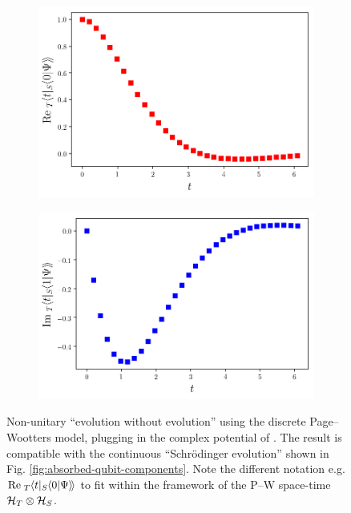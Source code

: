 \begin{figure}
  \centering
  \begin{subfigure}[b]{0.49\textwidth}
    \includegraphics[width=\linewidth]{img/2ldetect/re_psi0_t_pwlattice.png}
    \subcaption{}\label{fig:absorbed-qubit-components_pwlattice:re0}
  \end{subfigure}
  \begin{subfigure}[b]{0.49\textwidth}
    \includegraphics[width=\linewidth]{img/2ldetect/im_psi1_t_pwlattice.png}
    \subcaption{}\label{fig:absorbed-qubit-components_pwlattice:im1}
  \end{subfigure}
  \caption{
    Non-unitary ``evolution without evolution''
    using the discrete Page--Wootters model,
    plugging in
    the complex potential of \cite{RuschhauptAbsorption}.
    The result is compatible with the continuous
    ``Schr\"odinger evolution''
    shown in Fig. \ref{fig:absorbed-qubit-components}.
    Note the different notation e.g.
    $\mathrm{Re}{\;}_{T}\hspace{-.2em}\left\langle t | {}_{S}\hspace{-.2em}\left\langle 0 | \Psi \right\rangle\hspace{-.17em}\right\rangle$
    to fit within the framework of the P--W space-time $\mathcal{H}_T \otimes \mathcal{H}_S$.
  }
  \label{fig:absorbed-qubit-components_pwlattice}
\end{figure}

